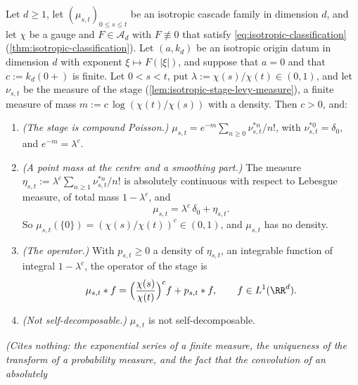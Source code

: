 \begin{proposition}
\label{prop:isotropic-stage-atom}
\leanok
Let $d \ge 1$, let $(\mu_{s,t})_{0 \le s \le t}$ be an isotropic cascade family in dimension $d$,
and let $\chi$ be a gauge and $F \in \mathcal{A}_d$ with $F \not\equiv 0$ that satisfy
\ref{eq:isotropic-classification} (\ref{thm:isotropic-classification}). Let $(a, k_d)$ be an
isotropic origin datum in dimension $d$ with exponent $\xi \mapsto F(|\xi|)$, and suppose that
$a = 0$ and that $c := k_d(0{+})$ is finite. Let $0 < s < t$, put
$\lambda := \chi(s)/\chi(t) \in (0,1)$, and let $\nu_{s,t}$ be the \Levy{} measure of the stage
(\ref{lem:isotropic-stage-levy-measure}), a finite measure of mass
$m := c\,\log(\chi(t)/\chi(s))$ with a density. Then $c > 0$, and:
\begin{enumerate}
\item \emph{(The stage is compound Poisson.)}
$\mu_{s,t} = e^{-m}\sum_{n \ge 0}\nu_{s,t}^{*n}/n!$, with $\nu_{s,t}^{*0} = \delta_0$, and
$e^{-m} = \lambda^c$.
\item \emph{(A point mass at the centre and a smoothing part.)} The measure
$\eta_{s,t} := \lambda^c\sum_{n \ge 1}\nu_{s,t}^{*n}/n!$ is absolutely continuous with respect
to Lebesgue measure, of total mass $1 - \lambda^c$, and
\[
  \mu_{s,t} = \lambda^c\,\delta_0 + \eta_{s,t} .
\]
So $\mu_{s,t}(\{0\}) = (\chi(s)/\chi(t))^c \in (0,1)$, and $\mu_{s,t}$ has no density.
\item \emph{(The operator.)} With $p_{s,t} \ge 0$ a density of $\eta_{s,t}$, an integrable
function of integral $1 - \lambda^c$, the operator of the stage is
\[
  \mu_{s,t} * f = \Bigl(\frac{\chi(s)}{\chi(t)}\Bigr)^{c} f + p_{s,t} * f ,
  \qquad f \in L^1(\RR^d) .
\]
\item \emph{(Not self-decomposable.)} $\mu_{s,t}$ is not self-decomposable.
\end{enumerate}
\statusT\quad\emph{(Cites nothing: the exponential series of a finite measure, the uniqueness of
the transform of a probability measure, and the fact that the convolution of an absolutely
}
\end{proposition}
